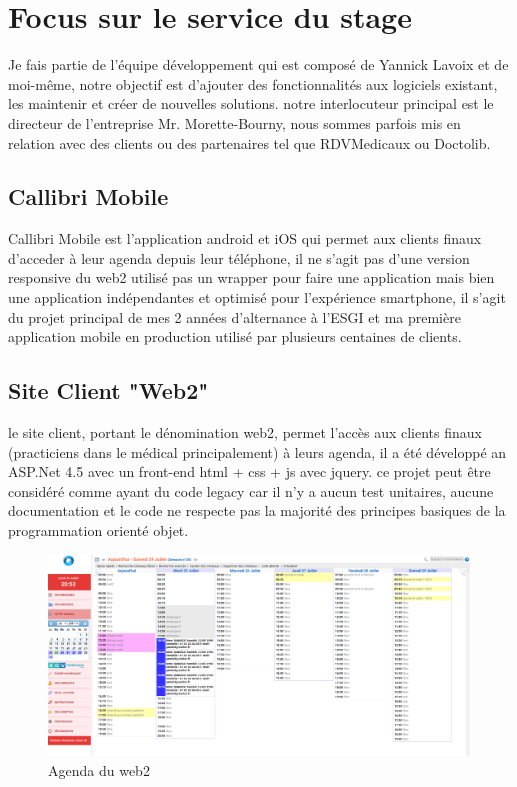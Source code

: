 \section{Focus sur le service du stage}
Je fais partie de l'équipe développement qui est composé de Yannick Lavoix et de moi-même, 
notre objectif est d'ajouter des fonctionnalités aux logiciels existant, 
les maintenir et créer de nouvelles solutions. notre interlocuteur principal est le directeur
de l'entreprise Mr. Morette-Bourny, nous sommes parfois mis en relation avec des clients 
ou des partenaires tel que RDVMedicaux ou Doctolib. \newline

\subsection{Callibri Mobile}
Callibri Mobile est l'application android et iOS qui permet aux clients finaux 
d'acceder à leur agenda depuis leur téléphone, il ne s'agit pas d'une version 
responsive du web2 utilisé pas un wrapper pour faire une application mais bien
une application indépendantes et optimisé pour l'expérience smartphone,
il s'agit du projet principal de mes 2 années d'alternance à l'ESGI et ma première 
application mobile en production utilisé par plusieurs centaines de clients.
\newpage

\subsection{Site Client "Web2"}
le site client, portant le dénomination web2, permet l'accès aux 
clients finaux (practiciens dans le médical principalement) à leurs agenda,
il a été développé an ASP.Net 4.5 avec un front-end html + css + js avec jquery.
ce projet peut être considéré comme ayant du code legacy car il n'y a aucun 
test unitaires, aucune documentation et le code ne respecte pas la majorité
des principes basiques de la programmation orienté objet. 
\newline

\begin{figure}[!h]
    \centering
    \includegraphics[width=1\linewidth]{Images/web2agenda}
    \caption{Agenda du web2}
    \label{fig:archhexa}
\end{figure}


